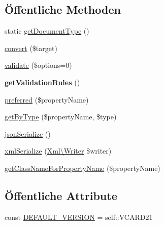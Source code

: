 \subsection*{Öffentliche Methoden}
\begin{DoxyCompactItemize}
\item 
static \mbox{\hyperlink{class_sabre_1_1_v_object_1_1_component_1_1_v_card_aed97d4a640b93b28da36636fde9e646f}{get\+Document\+Type}} ()
\item 
\mbox{\hyperlink{class_sabre_1_1_v_object_1_1_component_1_1_v_card_a8cf18d9fefb2775c6203ae8263f18121}{convert}} (\$target)
\item 
\mbox{\hyperlink{class_sabre_1_1_v_object_1_1_component_1_1_v_card_a0732946b8d61dd5b3a632f376501b031}{validate}} (\$options=0)
\item 
\mbox{\label{class_sabre_1_1_v_object_1_1_component_1_1_v_card_a2e84a88b410d211eedc9a300a51bd5ed}} 
{\bfseries get\+Validation\+Rules} ()
\item 
\mbox{\hyperlink{class_sabre_1_1_v_object_1_1_component_1_1_v_card_a3edf6cf7e9b9c94fb4384a6a61581a47}{preferred}} (\$property\+Name)
\item 
\mbox{\hyperlink{class_sabre_1_1_v_object_1_1_component_1_1_v_card_ab4c60984867e49780da3e882876d1e68}{get\+By\+Type}} (\$property\+Name, \$type)
\item 
\mbox{\hyperlink{class_sabre_1_1_v_object_1_1_component_1_1_v_card_a91547a8d1c9824b12f902890fbb05739}{json\+Serialize}} ()
\item 
\mbox{\hyperlink{class_sabre_1_1_v_object_1_1_component_1_1_v_card_ab197c95d8dcf17e48928155c40f8ba5d}{xml\+Serialize}} (\mbox{\hyperlink{class_sabre_1_1_xml_1_1_writer}{Xml\textbackslash{}\+Writer}} \$writer)
\item 
\mbox{\hyperlink{class_sabre_1_1_v_object_1_1_component_1_1_v_card_a57056c128a644f7b992ac0710a41a248}{get\+Class\+Name\+For\+Property\+Name}} (\$property\+Name)
\end{DoxyCompactItemize}
\subsection*{Öffentliche Attribute}
\begin{DoxyCompactItemize}
\item 
const \mbox{\hyperlink{class_sabre_1_1_v_object_1_1_component_1_1_v_card_a7bc0e2797587ec29e141407249660bb0}{D\+E\+F\+A\+U\+L\+T\+\_\+\+V\+E\+R\+S\+I\+ON}} = self\+::\+V\+C\+A\+R\+D21
\end{DoxyCompactItemize}
